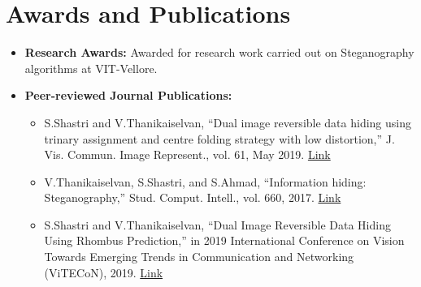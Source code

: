 \documentclass[a4paper,11pt]{article}
\begin{document}
\section{Awards and Publications}
	\begin{itemize}[leftmargin=*, itemsep = -4pt]
		\item \textbf{Research Awards: }{Awarded for research work carried out on Steganography algorithms at VIT-Vellore.}
		\item \textbf{Peer-reviewed Journal Publications:}
			\begin{itemize}[leftmargin=*, itemsep = -2pt, topsep = -4pt]
				\item{S.Shastri and V.Thanikaiselvan, “Dual image reversible data hiding using trinary assignment and centre folding strategy with low distortion,” J. Vis. Commun. Image Represent., vol. 61, May 2019. \href{https://doi.org/10.1016/j.jvcir.2019.03.022}{Link}}
				\item{V.Thanikaiselvan, S.Shastri, and S.Ahmad, “Information hiding: Steganography,” Stud. Comput. Intell., vol. 660, 2017. \href{https://doi.org/10.1007/978-3-319-44790-2\_4}{Link}}
        \item{S.Shastri and V.Thanikaiselvan, “Dual Image Reversible Data Hiding Using Rhombus Prediction,” in 2019 International Conference on Vision Towards Emerging Trends in Communication and Networking (ViTECoN), 2019. \href{https://doi.org/10.1109/ViTECoN.2019.8899667}{Link}}
      \end{itemize}
				
	\end{itemize}
			
\end{document}
